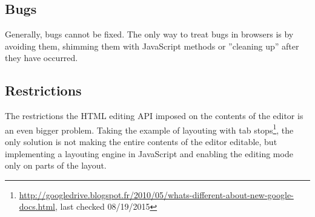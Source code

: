 \subsection{Bugs}

Generally, bugs cannot be fixed. The only way to treat bugs in browsers is by avoiding them, shimming them with JavaScript methods or ''cleaning up'' after they have occurred.

\subsection{Restrictions}
\label{subsec:treating_issues_last}

The restrictions the HTML editing API imposed on the contents of the editor is an even bigger problem. Taking the example of layouting with tab stops\footnote{\url{http://googledrive.blogspot.fr/2010/05/whats-different-about-new-google-docs.html}, last checked 08/19/2015}, the only solution is not making the entire contents of the editor editable, but implementing a layouting engine in JavaScript and enabling the editing mode only on parts of the layout.



